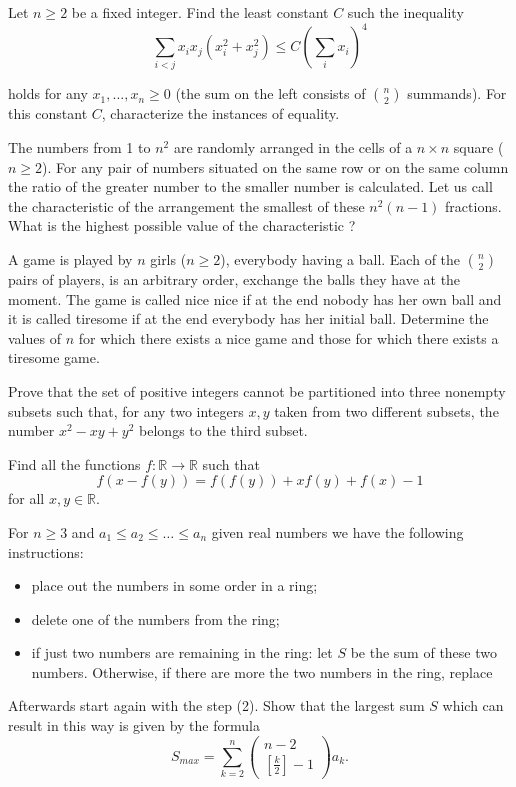 \item[\textbf{A1.}]Let $n \geq 2$ be a fixed integer. Find the least constant $C$ such the inequality\[\sum_{i<j} x_{i}x_{j} \left(x^{2}_{i}+x^{2}_{j} \right) \leq C
\left(\sum_{i}x_{i} \right)^4\]

holds for any $x_{1}, \ldots ,x_{n} \geq 0$ (the sum on the left consists of $\binom{n}{2}$ summands). For this constant $C$,  characterize the instances of equality.

\item[\textbf{A2.}]The numbers from 1 to $n^2$  are randomly arranged in the cells of a $n \times n$ square ($n \geq 2$). For any pair of numbers situated on the same row or on the same column the ratio of the greater number to the smaller number is calculated.  Let us call the characteristic of the arrangement the smallest of these $n^2\left(n-1\right)$ fractions. What is the highest possible value of the characteristic ?

\item[\textbf{A3.}]A game is played by $n$ girls ($n \geq 2$), everybody having a ball. Each of the $\binom{n}{2}$ pairs of players, is an arbitrary order, exchange the balls they have at the moment. The game is called nice nice if at the end nobody has her own ball and it is called tiresome if at the end everybody has her initial ball. Determine the values of $n$ for which there exists a nice game and those for which there exists a tiresome game.

\item[\textbf{A4.}]Prove that the set of positive integers cannot be partitioned into three nonempty subsets such that, for any two integers $x,y$ taken from two different subsets, the number $x^2-xy+y^2$ belongs to the third subset.

\item[\textbf{A5.}]Find all the functions $f: \mathbb{R} \to\mathbb{R}$ such that\[f(x-f(y))=f(f(y))+xf(y)+f(x)-1\]for all $x,y \in \mathbb{R} $.

\item[\textbf{A6.}]For $n \geq 3$ and $a_{1} \leq a_{2} \leq \ldots \leq a_{n}$ given real numbers we have the following instructions:

\begin{itemize}

\item place out the numbers in some order in a ring;

\item delete one of the numbers from the ring;

\item if just two numbers are remaining in the ring: let $S$ be the sum of these two numbers. Otherwise, if there are more the two numbers in the ring, replace

\end{itemize}

Afterwards start again with the step (2). Show that the largest sum $S$ which can result in this way is given by the formula\[S_{max}= \sum^n_{k=2} \begin{pmatrix} n -2 \\

[\frac{k}{2}] - 1\end{pmatrix}a_{k}.\]

